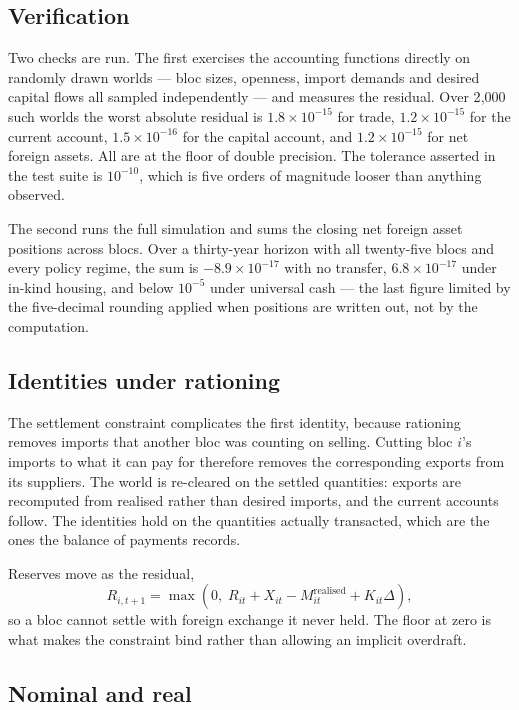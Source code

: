 \documentclass[preprint,review,12pt]{elsarticle}
\begin{document}
\subsection{Verification}

Two checks are run. The first exercises the accounting functions directly on
randomly drawn worlds --- bloc sizes, openness, import demands and desired
capital flows all sampled independently --- and measures the residual. Over
2{,}000 such worlds the worst absolute residual is $1.8 \times 10^{-15}$ for
trade, $1.2 \times 10^{-15}$ for the current account, $1.5 \times 10^{-16}$
for the capital account, and $1.2 \times 10^{-15}$ for net foreign assets. All
are at the floor of double precision. The tolerance asserted in the test suite
is $10^{-10}$, which is five orders of magnitude looser than anything
observed.

The second runs the full simulation and sums the closing net foreign asset
positions across blocs. Over a thirty-year horizon with all twenty-five blocs
and every policy regime, the sum is $-8.9 \times 10^{-17}$ with no transfer,
$6.8 \times 10^{-17}$ under in-kind housing, and below $10^{-5}$ under
universal cash --- the last figure limited by the five-decimal rounding
applied when positions are written out, not by the computation.

\subsection{Identities under rationing}

The settlement constraint complicates the first identity, because rationing
removes imports that another bloc was counting on selling. Cutting bloc $i$'s
imports to what it can pay for therefore removes the corresponding exports
from its suppliers. The world is re-cleared on the settled quantities: exports
are recomputed from realised rather than desired imports, and the current
accounts follow. The identities hold on the quantities actually transacted,
which are the ones the balance of payments records.

Reserves move as the residual,
\[R_{i,t+1} = \max\left(0,\; R_{it} + X_{it} - M^{\mathrm{realised}}_{it} + K_{it} \Delta\right), \tag{A.2}\]
so a bloc cannot settle with foreign exchange it never held. The floor at zero
is what makes the constraint bind rather than allowing an implicit overdraft.

\subsection{Nominal and real}
\end{document}
